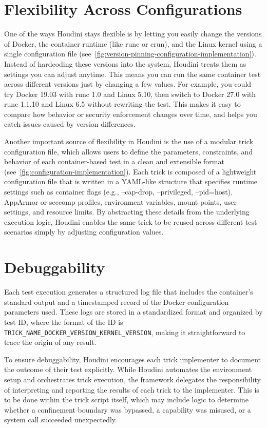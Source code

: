 \begin{doublespace}
\section{Flexibility Across Configurations}

One of the ways Houdini stays flexible is by letting you easily change the versions of Docker, the container runtime (like runc or crun), and the Linux kernel using a single configuration file (see~\ref{fig:version-pinning-configuration-implementation}). Instead of hardcoding these versions into the system, Houdini treats them as settings you can adjust anytime. This means you can run the same container test across different versions just by changing a few values. For example, you could try Docker 19.03 with runc 1.0 and Linux 5.10, then switch to Docker 27.0 with runc 1.1.10 and Linux 6.5 without rewriting the test. This makes it easy to compare how behavior or security enforcement changes over time, and helps you catch issues caused by version differences.

Another important source of flexibility in Houdini is the use of a modular trick configuration file, which allows users to define the parameters, constraints, and behavior of each container-based test in a clean and extensible format (see~\ref{fig:configuration-implementation}). Each trick is composed of a lightweight configuration file that is written in a YAML-like structure that specifies runtime settings such as container flags (e.g., --cap-drop, --privileged, --pid=host), AppArmor or seccomp profiles, environment variables, mount points, user settings, and resource limits. By abstracting these details from the underlying execution logic, Houdini enables the same trick to be reused across different test scenarios simply by adjusting configuration values.

\section{Debuggability}

Each test execution generates a structured log file that includes the container's standard output and a timestamped record of the Docker configuration parameters used. These logs are stored in a standardized format and organized by test ID, where the format of the ID is \texttt{TRICK_NAME_DOCKER_VERSION_KERNEL_VERSION}, making it straightforward to trace the origin of any result.

To ensure debuggability, Houdini encourages each trick implementer to document the outcome of their test explicitly. While Houdini automates the environment setup and orchestrates trick execution, the framework delegates the responsibility of interpreting and reporting the results of each trick to the implementer. This is to be done within the trick script itself, which may include logic to determine whether a confinement boundary was bypassed, a capability was misused, or a system call succeeded unexpectedly.


\end{doublespace}
